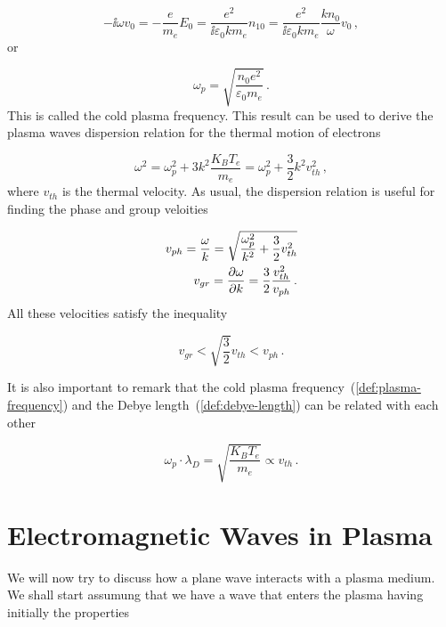 \documentclass[12pt, class=report, crop=false]{standalone}
\begin{document}
\begin{equation}
  -\ii\omega v_0 = - \frac{e}{m_e} E_0 =  \frac{e^2}{\ii \varepsilon_0 k m_e} n_{10} = \frac{e^2}{\ii \varepsilon_0 k m_e} \frac{k n_0}{\omega} v_0\,,
\end{equation}
or

\begin{equation}
  \label{def:plasma-frequency}
  \omega_p = \sqrt{\frac{n_0 e^2}{\varepsilon_0 m_e}}\,.
\end{equation}
This is called the cold plasma frequency. This result can be used to derive the plasma waves dispersion relation for the thermal motion of electrons

\begin{equation}
  \omega^2 = \omega_p^2 + 3 k^2 \frac{K_B T_e}{m_e} = \omega_p^2 + \frac{3}{2} k^2 v_{th}^2\,,
\end{equation}
where \(v_{th}\) is the thermal velocity. As usual, the dispersion relation is useful for finding the phase and group veloities

\begin{subequations}
  \begin{align}
    v_{ph} = \frac{\omega}{k} = \sqrt{\frac{\omega_p^2}{k^2} + \frac{3}{2} v_{th}^2} \\
    v_{gr} = \pdv{\omega}{k} = \frac{3}{2} \frac{v_{th}^2}{v_{ph}}\,.
  \end{align}
\end{subequations}
All these velocities satisfy the inequality

\begin{equation}
  v_{gr} < \sqrt{\frac{3}{2}} v_{th} < v_{ph}\,.
\end{equation}

It is also important to remark that the cold plasma frequency~(\ref{def:plasma-frequency}) and the Debye length~(\ref{def:debye-length}) can be related with each other

\begin{equation}
  \omega_p \cdot \lambda_D = \sqrt{\frac{K_B T_e}{m_e}} \propto v_{th}\,.
\end{equation}

\section{Electromagnetic Waves in Plasma}

We will now try to discuss how a plane wave interacts with a plasma medium. We shall start assumung that we have a wave that enters the plasma having initially the properties
\end{document}
